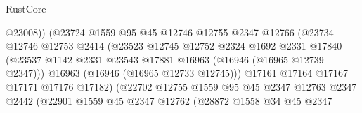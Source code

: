 \begin{lexlean}{RustCore}
\begin{coremodule}
                                        @23008))
                                    (@23724
                                      @1559
                                      @95
                                      @45
                                      @12746
                                      @12755
                                      @2347
                                      @12766
                                      (@23734
                                        @12746
                                        @12753
                                        @2414
                                        (@23523
                                          @12745
                                          @12752
                                          @2324
                                          @1692
                                          @2331
                                          @17840
                                          (@23537
                                            @1142
                                            @2331
                                            @23543
                                            @17881
                                            @16963
                                            (@16946 (@16965 @12739 @2347)))
                                          @16963
                                          (@16946 (@16965 @12733 @12745)))
                                        @17161
                                        @17164
                                        @17167
                                        @17171
                                        @17176
                                        @17182)
                                      (@22702
                                        @12755
                                        @1559
                                        @95
                                        @45
                                        @2347
                                        @12763
                                        @2347
                                        @2442
                                        (@22901
                                          @1559
                                          @45
                                          @2347
                                          @12762
                                          (@28872
                                            @1558
                                            @34
                                            @45
                                            @2347

\end{coremodule}
\end{lexlean}
